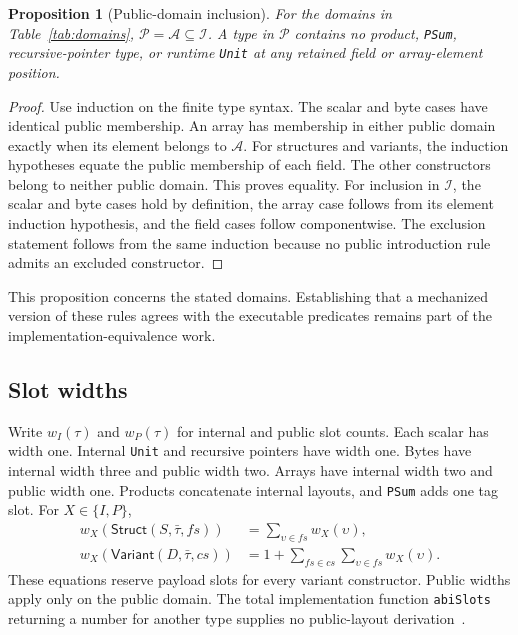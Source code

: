 \documentclass[11pt]{article}
\newcommand{\code}[1]{\texttt{#1}}
\newcommand{\ty}[1]{\mathsf{#1}}
\newcommand{\I}{\mathcal{I}}
\newcommand{\Pp}{\mathcal{P}}
\newcommand{\Ap}{\mathcal{A}}
\newtheorem{proposition}[definition]{Proposition}
\begin{document}
\begin{proposition}[Public-domain inclusion]
For the domains in Table~\ref{tab:domains}, $\Pp=\Ap\subseteq\I$.  A type in $\Pp$ contains no product, \code{PSum}, recursive-pointer type, or runtime \code{Unit} at any retained field or array-element position.
\end{proposition}
\begin{proof}
Use induction on the finite type syntax.  The scalar and byte cases have identical public membership.  An array has membership in either public domain exactly when its element belongs to $\Ap$.  For structures and variants, the induction hypotheses equate the public membership of each field.  The other constructors belong to neither public domain.  This proves equality.  For inclusion in $\I$, the scalar and byte cases hold by definition, the array case follows from its element induction hypothesis, and the field cases follow componentwise.  The exclusion statement follows from the same induction because no public introduction rule admits an excluded constructor.
\end{proof}

This proposition concerns the stated domains.  Establishing that a mechanized version of these rules agrees with the executable predicates remains part of the implementation-equivalence work.

\subsection{Slot widths}

Write $w_I(\tau)$ and $w_P(\tau)$ for internal and public slot counts.  Each scalar has width one.  Internal \code{Unit} and recursive pointers have width one.  Bytes have internal width three and public width two.  Arrays have internal width two and public width one.  Products concatenate internal layouts, and \code{PSum} adds one tag slot.  For $X\in\{I,P\}$,
\begin{align*}
w_X(\ty{Struct}(S,\bar\tau,fs))&=\sum_{\upsilon\in fs}w_X(\upsilon),\\
w_X(\ty{Variant}(D,\bar\tau,cs))&=1+\sum_{fs\in cs}\sum_{\upsilon\in fs}w_X(\upsilon).
\end{align*}
These equations reserve payload slots for every variant constructor.  Public widths apply only on the public domain.  The total implementation function \code{abiSlots} returning a number for another type supplies no public-layout derivation~\cite{types}.
\end{document}
